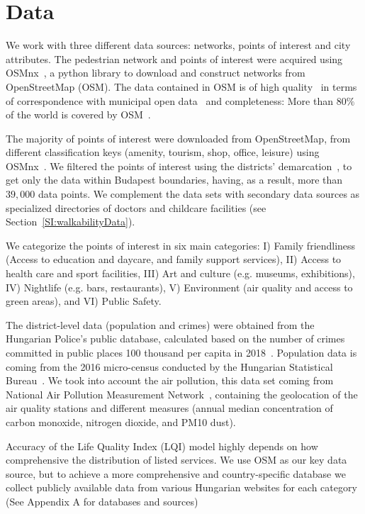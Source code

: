\section{Data}
We work with three different data sources: networks, points of interest and city attributes. The pedestrian network and points of interest were acquired using OSMnx~\cite{Boeing2017OSMNX}, a python library to download and construct networks from OpenStreetMap (OSM). The data contained in OSM is of high quality~\cite{Haklay2010OpenStreetMap,Girres2010Quality} in terms of correspondence with municipal open data~\cite{Ferster2019Bicycle} and completeness: More than $80\%$ of the world is covered by OSM~\cite{Barbosa-Filho2017Models}.

The majority of points of interest were downloaded from OpenStreetMap, from different classification keys (amenity, tourism, shop, office, leisure) using OSMnx~\cite{Boeing2017OSMNX}. We filtered the points of interest using the districts' demarcation~\cite{HU2019Districts}, to get only the data within Budapest boundaries, having, as a result, more than $39,000$ data points. We complement the data sets with secondary data sources as specialized directories of doctors and childcare facilities (see Section~\ref{SI:walkabilityData}).

We categorize the points of interest in six main categories: I) Family friendliness (Access to education and daycare, and family support services), II) Access to health care and sport facilities, III) Art and culture (e.g. museums, exhibitions), IV) Nightlife (e.g. bars, restaurants), V) Environment (air quality and access to green areas), and VI) Public Safety. %

The district-level data (population and crimes) were obtained from the Hungarian Police's public database, calculated based on the number of crimes committed in public places 100 thousand per capita in 2018~\cite{HU2019Police}. Population data is coming from the 2016 micro-census conducted by the Hungarian Statistical Bureau~\cite{HU2016Population}. We took into account the air pollution, this data set coming from National Air Pollution Measurement Network~\cite{HU2019Pollution}, containing the geolocation of the air quality stations and different measures (annual median concentration of carbon monoxide, nitrogen dioxide, and PM10 dust).

Accuracy of the Life Quality Index (LQI) model highly depends on how comprehensive the distribution of listed services. We use OSM as our key data source, but to achieve a more comprehensive and country-specific database we collect publicly available data from various Hungarian websites for each category (See Appendix A for databases and sources)

